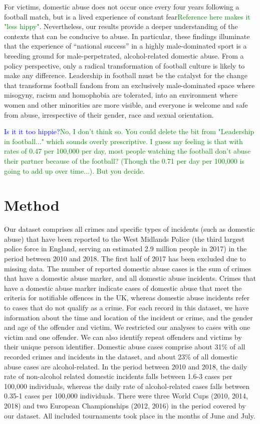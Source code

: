 \documentclass[12pt, letterpaper]{article}
\newcommand{\NS}[1] {{\textcolor{green}{#1}}}
\newcommand{\AT}[1] {{\textcolor{blue}{#1}}}
\begin{document}
{For victims, domestic abuse does not occur once every four years following a football match, but is a lived experience of constant fear\NS{Reference here makes it "less hippy"}. 
Nevertheless, our results provide a deeper understanding of the contexts that can be conducive to abuse. In particular, these findings illuminate that the experience of ``national success'' in a highly male-dominated sport is a breeding ground for male-perpetrated, alcohol-related domestic abuse. From a policy perspective, only a radical transformation of football culture is likely to make any difference\autocite{Swallow}. Leadership in football must be the catalyst for the change that transforms football fandom from an exclusively male-dominated space where misogyny, racism and homophobia are tolerated, into an environment where women and other minorities are more visible, and everyone is welcome and safe from abuse, irrespective of their gender, race and sexual orientation. 

\AT{Is it it too hippie?}\NS{No, I don't think so. You could delete the bit from "Leadership in football..." which sounds overly prescriptive. I guess my feeling is that with rates of 0.47 per 100,000 per day, most people watching the football don't abuse their partner because of the football? (Though the 0.71 per day per 100,000 is going to add up over time...). But you decide.}

\newpage

\section*{Method}

Our dataset comprises all crimes and specific types of incidents (such as domestic abuse) that have been reported to the West Midlands Police (the third largest police force in England\autocite{Homeoffice}, serving an estimated 2.9 million people in 2017\autocite{populationfigure}) in the period between 2010 and 2018. The first half of 2017 has been excluded due to missing data. The number of reported domestic abuse cases is the sum of crimes that have a domestic abuse marker, and all domestic abuse incidents. Crimes that have a domestic abuse marker indicate cases of domestic abuse that meet the criteria for notifiable offences in the UK, whereas domestic abuse incidents refer to cases that do not qualify as a crime. For each record in this dataset, we have information about the time and location of the incident or crime, and the gender and age of the offender and victim. We restricted our analyses to cases with one victim and one offender. We can also identify repeat offenders and victims by their unique person identifier. Domestic abuse cases comprise about 31\% of all recorded crimes and incidents in the dataset, and about 23\% of all domestic abuse cases are alcohol-related. In the period between 2010 and 2018, the daily rate of non-alcohol related domestic incidents falls between 1.6-3 cases per 100,000 individuals, whereas the daily rate of alcohol-related cases falls between 0.35-1 cases per 100,000 individuals. There were three World Cups (2010, 2014, 2018) and two European Championships (2012, 2016) in the period covered by our dataset. All included tournaments took place in the months of June and July.

}
\end{document}
